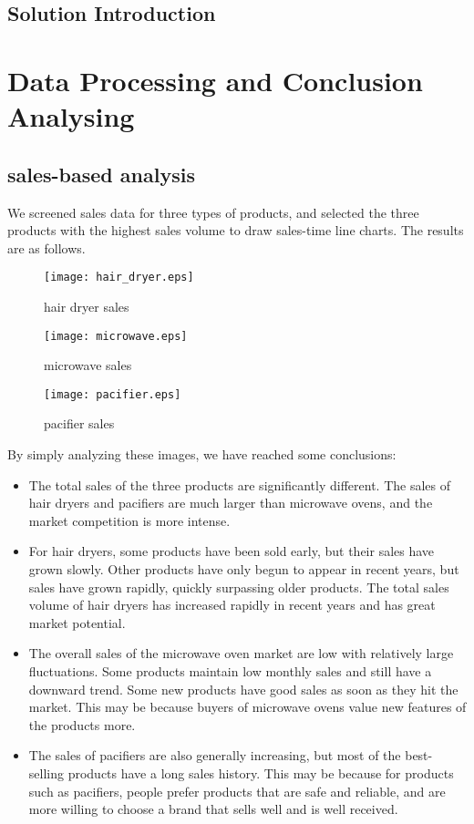 \documentclass{mcmthesis}
\begin{document}
	\subsection{Solution Introduction}
	
	\section{Data Processing and Conclusion Analysing}
	
	\subsection{sales-based analysis}
	We screened sales data for three types of products, and selected the three products with the highest sales volume to draw sales-time line charts. The results are as follows.
	
	\begin{figure}[H]
		\small
		\centering
		\texttt{[image: hair\_dryer.eps]}
		\caption{hair dryer sales} \label{hair dryer sales}
	\end{figure}
	
	\begin{figure}[H]
		\small
		\centering
		\texttt{[image: microwave.eps]}
		\caption{microwave sales} \label{microwave sales}
	\end{figure}
	
	\begin{figure}[H]
		\small
		\centering
		\texttt{[image: pacifier.eps]}
		\caption{pacifier sales} \label{pacifier sales}
	\end{figure}
	
	By simply analyzing these images, we have reached some conclusions:
	\begin{itemize}
		\item
		The total sales of the three products are significantly different. The sales of hair dryers and pacifiers are much larger than microwave ovens, and the market competition is more intense.
		\item
		For hair dryers, some products have been sold early, but their sales have grown slowly. Other products have only begun to appear in recent years, but sales have grown rapidly, quickly surpassing older products. The total sales volume of hair dryers has increased rapidly in recent years and has great market potential.
		\item
		The overall sales of the microwave oven market are low with relatively large fluctuations. Some products maintain low monthly sales and still have a downward trend. Some new products have good sales as soon as they hit the market. This may be because buyers of microwave ovens value new features of the products more.
		\item
		The sales of pacifiers are also generally increasing, but most of the best-selling products have a long sales history. This may be because for products such as pacifiers, people prefer products that are safe and reliable, and are more willing to choose a brand that sells well and is well received.
	\end{itemize}
	
\end{document}
